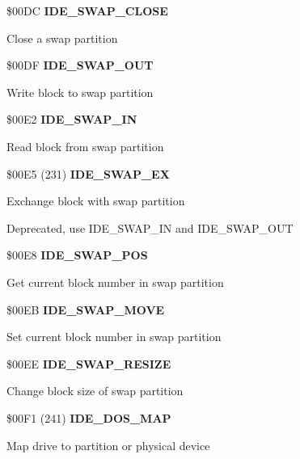 %

\$00DC \textbf{IDE\_SWAP\_CLOSE}

Close a swap partition

\$00DF \textbf{IDE\_SWAP\_OUT}

Write block to swap partition

\$00E2 \textbf{IDE\_SWAP\_IN}

Read block from swap partition

\$00E5 (231) \textbf{IDE\_SWAP\_EX}

Exchange block with swap partition

Deprecated, use IDE\_SWAP\_IN and IDE\_SWAP\_OUT

\$00E8 \textbf{IDE\_SWAP\_POS}

Get current block number in swap partition

\$00EB \textbf{IDE\_SWAP\_MOVE}

Set current block number in swap partition

\$00EE \textbf{IDE\_SWAP\_RESIZE}

Change block size of swap partition

\$00F1 (241) \textbf{IDE\_DOS\_MAP}

Map drive to partition or physical device


